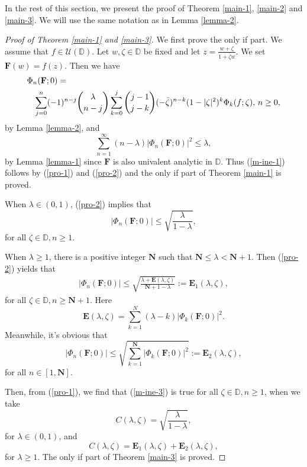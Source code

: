 \documentclass[10pt]{amsart}
\theoremstyle{definition}
\theoremstyle{remark}
\numberwithin{equation}{section}
\begin{document}
In the rest of this section, we present the proof of Theorem \ref{main-1},  \ref{main-2} and \ref{main-3}.  We will use the same notation as in Lemma \ref{lemma-2}.
\begin{proof}[Proof of Theorem \ref{main-1} and \ref{main-3}]
We first prove the only if part. We assume that $f\in \mathcal{U}(\mathbb{D})$.  Let $w, \zeta\in \mathbb{D}$ be fixed and let $z=\frac{w+\zeta}{1+\bar{\zeta}w}$.  We set $\mathbf{F}(w)=f(z)$.  Then we have 
\begin{eqnarray}\label{pro-1}
\lefteqn{\Phi_{n}(\mathbf{F}; 0)=} \\
&&\sum_{j=0}^{n}(-1)^{n-j}\binom{\lambda}{n-j}\sum_{k=0}^{j}\binom{j-1}{j-k}(-\bar{\zeta})^{n-k}(1-|\zeta|^2)^{k}\Phi_{k}(f; \zeta),\, n \geq 0, \nonumber
\end{eqnarray}
by Lemma \ref{lemma-2}, and \begin{equation}\label{pro-2}
 \sum_{n=1}^{\infty}(n-\lambda)|\Phi_n(\mathbf{F}; 0)|^2\leq \lambda,
 \end{equation}
 by  Lemma \ref{lemma-1} since $\mathbf{F}$ is also univalent analytic in $\mathbb{D}$. Thus (\ref{m-ine-1}) follows by (\ref{pro-1}) and (\ref{pro-2}) and the only if part of Theorem \ref{main-1} is proved.
 
 When $\lambda\in (0,1)$, (\ref{pro-2}) implies that  
\begin{equation}|\Phi_n(\mathbf{F}; 0)|\leq  \sqrt{\frac{\lambda}{1-\lambda}},  \nonumber
\end{equation}for all $\zeta\in \mathbb{D}, n\geq 1.$

When $\lambda\geq1$,  there is a positive integer $\mathbf{N}$ such that $\mathbf{N}\leq \lambda < \mathbf{N}+1$. Then (\ref{pro-2}) yields  that  
\begin{eqnarray}
|\Phi_n(\mathbf{F}; 0)| \leq\sqrt{\frac{\lambda+ \mathbf{E}(\lambda, \zeta)}{\mathbf{N}+1-\lambda}}:=\mathbf{E}_1(\lambda, \zeta), \nonumber
\end{eqnarray}
for all $\zeta\in \mathbb{D}, n\geq \mathbf{N}+1$.  Here $$ \mathbf{E}(\lambda, \zeta)=\sum_{k=1}^{N}(\lambda-k)|\Phi_k(\mathbf{F}; 0)|^2.$$
Meanwhile, it's obvious that 
$$|\Phi_n(\mathbf{F}; 0)|  \leq \sqrt{\sum_{k=1}^{\mathbf{N}}|\Phi_k(\mathbf{F}; 0)|^2}:=\mathbf{E}_2(\lambda, \zeta),$$ for all $n \in [1, \mathbf{N}].$ 

Then, from (\ref{pro-1}), we find that (\ref{m-ine-3}) is true for all $\zeta\in \mathbb{D}, n\geq 1$,  when we take 
$$C(\lambda, \zeta)=\sqrt{\frac{\lambda}{1-\lambda}},$$ for $\lambda\in (0,1)$, 
and  
$$C(\lambda, \zeta)=\mathbf{E}_1(\lambda, \zeta)+\mathbf{E}_2(\lambda, \zeta),$$
for $\lambda\geq 1$.  The only if part of Theorem \ref{main-3} is proved.


\end{proof}
\end{document}
